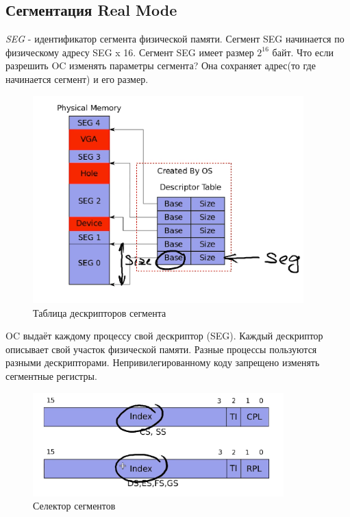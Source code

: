 	\subsection{Сегментация Real Mode}
	
	\par \textit{SEG} - идентификатор сегмента физической памяти. Сегмент SEG начинается по физическому адресу SEG x 16. Сегмент SEG имеет размер \(2^{16}\) байт. Что если разрешить OC изменять параметры сегмента? Она сохраняет адрес(то где начинается сегмент) и его размер. 
	
	\begin{figure}[h]
		\centering
		\includegraphics[height=8cm]{img/3.6} 
		\captionsetup{font=footnotesize} 
		\caption*{Таблица дескрипторов сегмента} 
	\end{figure}
	
	\par OC выдаёт каждому процессу свой дескриптор (SEG). Каждый дескриптор описывает свой участок физической памяти. Разные процессы пользуются разными дескрипторами. Непривилегированному коду запрещено изменять сегментные регистры.
	
	\begin{figure}[h]
		\centering
		\includegraphics[height=4cm]{img/3.7} 
		\captionsetup{font=footnotesize} 
		\caption*{Селектор сегментов} 
	\end{figure}
	
